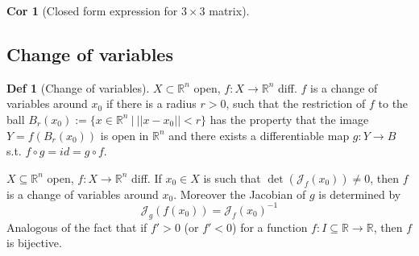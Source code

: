 \documentclass[a4paper, 10pt]{article}
\newtheorem*{corollary}{Cor}
\theoremstyle{definition}
\newtheorem*{definition}{Def}
\newcommand{\R}{\mathbb{R}}
\newcommand{\J}{\mathcal{J}}
\begin{document}
\begin{corollary}[Closed form expression for \(3 \times 3\) matrix] \ \\
\end{corollary}

\subsection{Change of variables}
\begin{definition}[Change of variables]
    \(X \subset \R^n\) open, \(f: X \to \R^n\) diff. \(f\) is a change of variables around \(x_0\) if there is a radius \(r > 0\), such that the restriction of \(f\) to the ball \(B_r(x_0) := \{x \in \R^n \ | \ ||x - x_0|| < r\}\) has the property that the image \(Y = f(B_r(x_0))\) is open in \(\R^n\) and there exists a differentiable map \(g: Y \to B\) s.t. \(f \circ g = id = g \circ f\).
\end{definition}

\begin{ntheorem*}
    \(X \subseteq \R^n\) open, \(f: X \to \R^n\) diff. If \(x_0 \in X\) is such that \(\det(\J_f(x_0)) \neq 0\), then \(f\) is a change of variables around \(x_0\). Moreover the Jacobian of \(g\) is determined by
    \[\J_g(f(x_0)) = \J_f(x_0)^{-1}\]
    Analogous of the fact that if \(f' > 0\) (or \(f' < 0\)) for a function \(f: I \subseteq \R \to \R\), then \(f\) is bijective.
\end{ntheorem*}
\end{document}
